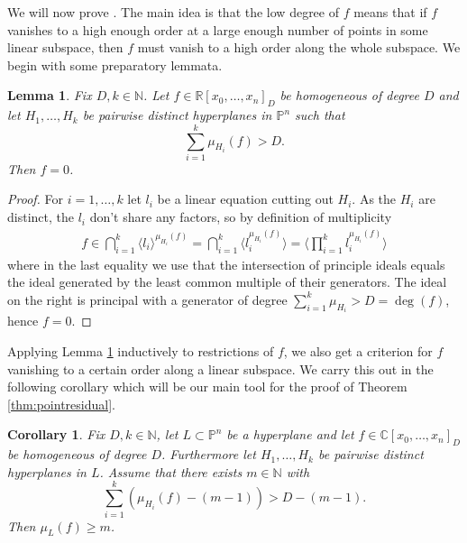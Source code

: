 \documentclass[a4paper,10pt]{amsart}
\theoremstyle{definition}
\theoremstyle{plain}
\newtheorem{lem}[defin]{Lemma}
\newtheorem{cor}[defin]{Corollary}
\newcommand{\C}{{\mathbb C}}
\newcommand{\R}{{\mathbb R}}
\newcommand{\pp}{\mathbb{P}}
\newcommand{\N}{{\mathbb N}}
\begin{document}
We will now prove . The main idea is that the low degree of $f$ means that if $f$ vanishes to a high enough order at a large enough number of points in some linear subspace, then $f$ must vanish to a high order along the whole subspace. We begin with some preparatory lemmata.


\begin{lem} \label{lem: linear_van_order_Mult}
Fix $D,k\in \N$.
 Let  $f \in \R[x_0, \dots, x_n]_D$ be homogeneous of degree $D$ and let $H_1, \dots, H_{k}$ be pairwise distinct hyperplanes in $\pp^{n}$ such that
 \begin{equation*}
     \sum_{i=1}^k \mu_{H_i}(f) > D.
 \end{equation*}
  Then $f = 0$.
\end{lem}

\begin{proof}
For $i=1,\ldots,k$ let $l_i$ be a linear equation cutting out $H_i$. As the $H_i$ are distinct, the $l_i$ don't share any factors, so by definition of multiplicity
\begin{align*}
    f\in \bigcap_{i=1}^k \langle l_i\rangle^{\mu_{H_i}(f)}=
    \bigcap_{i=1}^k \langle l_i^{\mu_{H_i}(f)}\rangle
    =\langle \prod_{i=1}^kl_i^{\mu_{H_i}(f)}\rangle
\end{align*}  
where in the last equality we use that the intersection of principle ideals equals the ideal generated by the least common multiple of their generators. The ideal on the right is principal with a generator of degree $\sum_{i=1}^k\mu_{H_i}>D=\deg(f)$, hence $f=0$.

\end{proof}
Applying Lemma \ref{lem: linear_van_order_Mult} inductively to restrictions of $f$, we also get a criterion for $f$ vanishing to a certain order along a linear subspace. We carry this out in the following corollary which will be our main tool for the proof of Theorem \ref{thm:pointresidual}.
\begin{cor} \label{cor: van_order_Mult}
 Fix $D,k\in \N$, let $L\subset \pp^{n}$ be a hyperplane and let $f \in \C[x_0, \dots, x_{n}]_D$ be homogeneous of degree $D$. Furthermore let $H_1, \dots, H_k$ be pairwise distinct hyperplanes in $L$. Assume that there exists $m \in \N$ with
 \begin{equation*}
     \sum_{i=1}^k (\mu_{H_i}(f)-(m-1)) > D - (m -1).
 \end{equation*}
 Then $\mu_L(f) \geq m$.
\end{cor}
\end{document}
